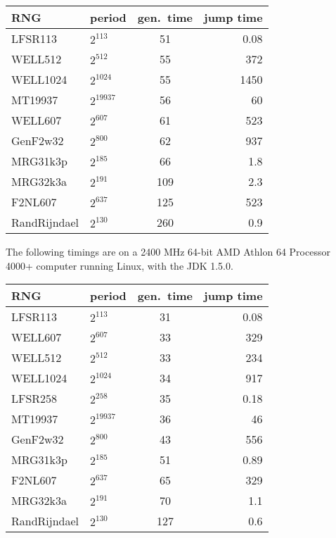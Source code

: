 \begin{center}
\begin{tabular}{|l|lcr|}
\hline
 RNG  &  period  & gen.\ time  &  jump time \\    
\hline
 LFSR113\rule{0pt}{1em} & $2^{113}$   & \phantom{0}51  & 0.08 \\
 WELL512      & $2^{512}$   & \phantom{0}55             & 372    \\
 WELL1024     & $2^{1024}$  & \phantom{0}55             & 1450   \\
 MT19937      & $2^{19937}$ & \phantom{0}56             & 60   \\
 WELL607      & $2^{607}$   & \phantom{0}61             & 523    \\
 GenF2w32     & $2^{800}$   & \phantom{0}62             & 937    \\
 MRG31k3p     & $2^{185}$   & \phantom{0}66             & 1.8   \\
 MRG32k3a     & $2^{191}$   & 109  & 2.3   \\
 F2NL607      & $2^{637}$   & 125  & 523    \\
 RandRijndael & $2^{130}$   & 260  & 0.9  \\
\hline
\end{tabular}
\end{center}

The following timings are on a 2400 MHz 64-bit AMD Athlon 64 Processor 4000+
computer running Linux, with the JDK 1.5.0.


\begin{center}
\begin{tabular}{|l|lcr|}
\hline
 RNG  &  period  & gen.\ time  &  jump time \\    
\hline
 LFSR113\rule{0pt}{1em} & $2^{113}$   & \phantom{0}31  & 0.08 \\
 WELL607      & $2^{607}$   & \phantom{0}33             & 329    \\
 WELL512      & $2^{512}$   & \phantom{0}33             & 234    \\
 WELL1024     & $2^{1024}$  & \phantom{0}34             & 917   \\
 LFSR258      & $2^{258}$   & \phantom{0}35             & 0.18   \\
 MT19937      & $2^{19937}$ & \phantom{0}36             & 46   \\
 GenF2w32     & $2^{800}$   & \phantom{0}43             & 556    \\
 MRG31k3p     & $2^{185}$   & \phantom{0}51             & 0.89   \\
 F2NL607      & $2^{637}$   & \phantom{0}65  & 329    \\
 MRG32k3a     & $2^{191}$   & \phantom{0}70   & 1.1   \\
 RandRijndael & $2^{130}$   & 127  & 0.6  \\
\hline
\end{tabular}
\end{center}


